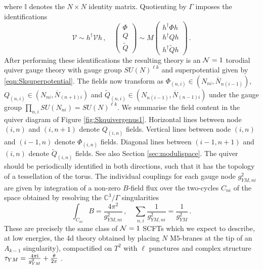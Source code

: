 \documentclass[main.tex]{subfiles}
\begin{document}
where $\mathbb{I}$ denotes the $N\times N$ identity matrix.  Quotienting by $\Gamma$ imposes the identifications
\begin{equation}
\mathcal{V}\sim h^{\dagger}\mathcal{V}h\,,\quad \begin{pmatrix}\Phi\\Q\\\widetilde{Q}\end{pmatrix}\sim M\begin{pmatrix}h^{\dagger}\Phi h\\h^{\dagger}Qh\\h^{\dagger}\widetilde{Q}h\end{pmatrix}\,.
\end{equation}
After performing these identifications the resulting theory is an $\mathcal{N}=1$ torodial quiver gauge theory with gauge group $SU\left(N\right)^{\ell k}$ and superpotential given by \eqref{eqn:Sksuperpotential}.  The fields now transform as $\Phi_{(n,i)}\in (N_{ni},\overline{N}_{n(i-1)})$, $Q_{(n,i)}\in (N_{ni},\overline{N}_{(n+1)i})$ and $\widetilde{Q}_{(n,i)}\in (N_{n(i-1)},\overline{N}_{(n-1)i})$ under the gauge group $\prod_{n,i}SU(N_{ni})=SU\left(N\right)^{\ell k}$.  We summarise the field content in the quiver diagram of Figure \ref{fig:Skquivergenus1}.  Horizontal lines between node $(i,n)$ and $(i,n+1)$ denote $Q_{(i,n)}$ fields.  Vertical lines between node $(i,n)$ and $(i-1,n)$ denote $\Phi_{(i,n)}$ fields.  Diagonal lines between $(i-1,n+1)$ and $(i,n)$ denote $\widetilde{Q}_{(i,n)}$ fields.  See also Section \ref{sec:modulispace}.  The quiver should be periodically identified in both directions, such that it has the topology of a tessellation of the  torus.  The individual couplings for each gauge node $g_{YM,ni}^2$ are given by integration of a non-zero $B$-field flux over the two-cycles $C_{ni}$ of the space obtained by resolving the $\mathbb{C}^3/\Gamma$ singularities
\begin{equation}\label{eqn:Bfield}
\int_{C_{ni}}B=\frac{4\pi^2}{g^2_{YM,ni}}\,,\quad \sum_{n,i}\frac{1}{g_{YM,ni}^2}=\frac{1}{g^2_{YM}}\,.
\end{equation}
These are precisely the same class of $\mathcal{N}=1$ SCFTs which we expect to describe, at low energies, the 4d theory obtained by placing $N$ M$5$-branes at the tip of an $A_{k-1}$ singularity), compactified on $T^2$ with $\ell$ punctures and complex structure $\tau_{YM}=\frac{4\pi\mathrm{i}}{g_{YM}^2}+  \frac{\theta}{2\pi}$ \cite{Gaiotto:2015usa}.   
\end{document}
